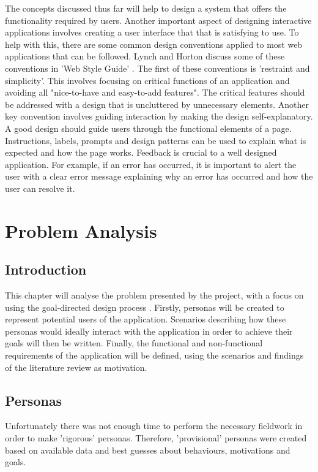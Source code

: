 \documentclass[authoryearcitations]{UoYCSproject}
\begin{document}
The concepts discussed thus far will help to design a system that offers the functionality required by users. Another important aspect of designing interactive applications involves creating a user interface that that is satisfying to use. To help with this, there are some common design conventions applied to most web applications that can be followed. Lynch and Horton discuss some of these conventions in 'Web Style Guide' \citep{Lynch2009}. The first of these conventions is 'restraint and simplicity'. This involves focusing on critical functions of an application and avoiding all "nice-to-have and easy-to-add features". The critical features should be addressed with a design that is uncluttered by unnecessary elements. Another key convention involves guiding interaction by making the design self-explanatory. A good design should guide users through the functional elements of a page. Instructions, labels, prompts and design patterns can be used to explain what is expected and how the page works. Feedback is crucial to a well designed application. For example, if an error has occurred, it is important to alert the user with a clear error message explaining why an error has occurred and how the user can resolve it. 


\chapter{Problem Analysis}

\section{Introduction}

This chapter will analyse the problem presented by the project, with a focus on using the goal-directed design process \citep{Cooper2007}. Firstly, personas will be created to represent potential users of the application. Scenarios describing how these personas would ideally interact with the application in order to achieve their goals will then be written. Finally, the functional and non-functional requirements of the application will be defined, using the scenarios and findings of the literature review as motivation. 

\section{Personas} 

Unfortunately there was not enough time to perform the necessary fieldwork in order to make 'rigorous' personas. Therefore, 'provisional' personas were created based on available data and best guesses about behaviours, motivations and goals.
\end{document}
